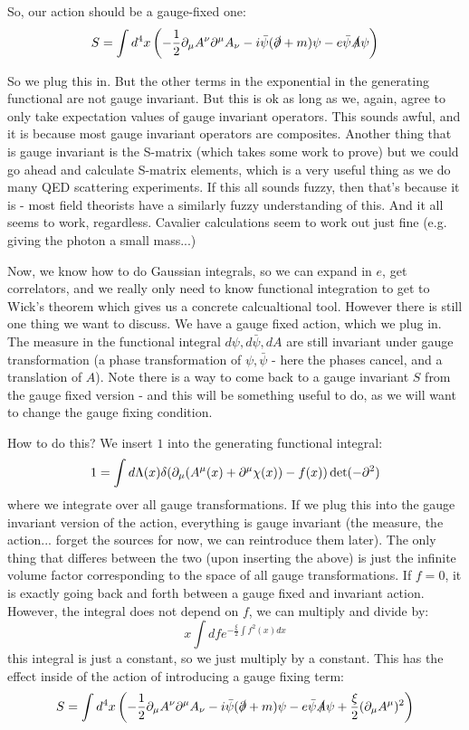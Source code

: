 So, our action should be a gauge-fixed one:
\begin{equation}
    S = \int d^4x \left(-\frac{1}{2}\partial_\mu A^\nu \partial^\mu A_\nu - i\bar{\psi}(\slashed{\partial} + m)\psi - e\bar{\psi}\slashed{A}\psi\right)
\end{equation}

So we plug this in. But the other terms in the exponential in the generating functional are not gauge invariant. But this is ok as long as we, again, agree to only take expectation values of gauge invariant operators. This sounds awful, and it is because most gauge invariant operators are composites. Another thing that is gauge invariant is the S-matrix (which takes some work to prove) but we could go ahead and calculate S-matrix elements, which is a very useful thing as we do many QED scattering experiments. If this all sounds fuzzy, then that's because it is - most field theorists have a similarly fuzzy understanding of this. And it all seems to work, regardless. Cavalier calculations seem to work out just fine (e.g. giving the photon a small mass...)

Now, we know how to do Gaussian integrals, so we can expand in $e$, get correlators, and we really only need to know functional integration to get to Wick's theorem which gives us a concrete calcualtional tool. However there is still one thing we want to discuss. We have a gauge fixed action, which we plug in. The measure in the functional integral $d\psi, d\bar{\psi}, dA$ are still invariant under gauge transformation (a phase transformation of $\psi, \bar{\psi}$ - here the phases cancel, and a translation of $A$).  Note there is a way to come back to a gauge invariant $S$ from the gauge fixed version - and this will be something useful to do, as we will want to change the gauge fixing condition.

How to do this? We insert $1$ into the generating functional integral:
\begin{equation}
    1 = \int d\Lambda(x)\delta(\partial_\mu (A^\mu(x) + \partial^\mu \chi(x)) - f(x))\det(-\partial^2)
\end{equation}
where we integrate over all gauge transformations. If we plug this into the gauge invariant version of the action, everything is gauge invariant (the measure, the action... forget the sources for now, we can reintroduce them later). The only thing that differes between the two (upon inserting the above) is just the infinite volume factor corresponding to the space of all gauge transformations. If $f = 0$, it is exactly going back and forth between a gauge fixed and invariant action. However, the integral does not depend on $f$, we can multiply and divide by:
\begin{equation}
    x\int df e^{-\frac{\xi}{2}\int f^2(x)dx}
\end{equation}
this integral is just a constant, so we just multiply by a constant. This has the effect inside of the action of introducing a gauge fixing term:
\begin{equation}
    S = \int d^4x \left(-\frac{1}{2}\partial_\mu A^\nu \partial^\mu A_\nu - i\bar{\psi}(\slashed{\partial} + m)\psi - e\bar{\psi}\slashed{A}\psi + \frac{\xi}{2}(\partial_\mu A^\mu)^2\right)
\end{equation}

